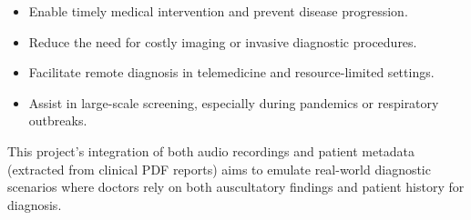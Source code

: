 \begin{itemize}
    \item Enable timely medical intervention and prevent disease progression.
    \item Reduce the need for costly imaging or invasive diagnostic procedures.
    \item Facilitate remote diagnosis in telemedicine and resource-limited settings.
    \item Assist in large-scale screening, especially during pandemics or respiratory outbreaks.
\end{itemize}

This project's integration of both audio recordings and patient metadata (extracted from clinical PDF reports) aims to emulate real-world diagnostic scenarios where doctors rely on both auscultatory findings and patient history for diagnosis.
